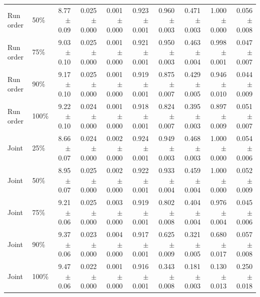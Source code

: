 \begin{landscape}
\begin{longtable}{llrrrrrrrr}
Run order & 50\% & 8.77 $\pm$ 0.09 & 0.025 $\pm$ 0.000 & 0.001 $\pm$ 0.000 & 0.923 $\pm$ 0.001 & 0.960 $\pm$ 0.003 & 0.471 $\pm$ 0.003 & 1.000 $\pm$ 0.000 & 0.056 $\pm$ 0.008 \\
Run order & 75\% & 9.03 $\pm$ 0.10 & 0.025 $\pm$ 0.000 & 0.001 $\pm$ 0.000 & 0.921 $\pm$ 0.001 & 0.950 $\pm$ 0.003 & 0.463 $\pm$ 0.004 & 0.998 $\pm$ 0.001 & 0.047 $\pm$ 0.007 \\
Run order & 90\% & 9.17 $\pm$ 0.10 & 0.025 $\pm$ 0.000 & 0.001 $\pm$ 0.000 & 0.919 $\pm$ 0.001 & 0.875 $\pm$ 0.007 & 0.429 $\pm$ 0.005 & 0.946 $\pm$ 0.010 & 0.044 $\pm$ 0.009 \\
Run order & 100\% & 9.22 $\pm$ 0.10 & 0.024 $\pm$ 0.000 & 0.001 $\pm$ 0.000 & 0.918 $\pm$ 0.001 & 0.824 $\pm$ 0.007 & 0.395 $\pm$ 0.003 & 0.897 $\pm$ 0.009 & 0.051 $\pm$ 0.007 \\
Joint & 25\% & 8.66 $\pm$ 0.07 & 0.024 $\pm$ 0.000 & 0.002 $\pm$ 0.000 & 0.924 $\pm$ 0.001 & 0.949 $\pm$ 0.003 & 0.468 $\pm$ 0.003 & 1.000 $\pm$ 0.000 & 0.054 $\pm$ 0.006 \\
Joint & 50\% & 8.95 $\pm$ 0.07 & 0.025 $\pm$ 0.000 & 0.002 $\pm$ 0.000 & 0.922 $\pm$ 0.001 & 0.933 $\pm$ 0.004 & 0.459 $\pm$ 0.004 & 1.000 $\pm$ 0.000 & 0.052 $\pm$ 0.009 \\
Joint & 75\% & 9.21 $\pm$ 0.06 & 0.025 $\pm$ 0.000 & 0.003 $\pm$ 0.000 & 0.919 $\pm$ 0.001 & 0.802 $\pm$ 0.008 & 0.404 $\pm$ 0.004 & 0.976 $\pm$ 0.004 & 0.045 $\pm$ 0.006 \\
Joint & 90\% & 9.37 $\pm$ 0.06 & 0.023 $\pm$ 0.000 & 0.004 $\pm$ 0.000 & 0.917 $\pm$ 0.001 & 0.625 $\pm$ 0.009 & 0.321 $\pm$ 0.005 & 0.680 $\pm$ 0.017 & 0.057 $\pm$ 0.008 \\
Joint & 100\% & 9.47 $\pm$ 0.06 & 0.022 $\pm$ 0.000 & 0.001 $\pm$ 0.000 & 0.916 $\pm$ 0.001 & 0.343 $\pm$ 0.008 & 0.181 $\pm$ 0.003 & 0.130 $\pm$ 0.013 & 0.250 $\pm$ 0.018 \\
\end{longtable}
\end{landscape}
